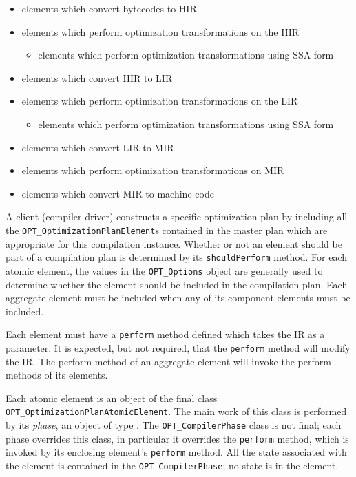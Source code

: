 \begin{itemize}
\item elements which convert bytecodes to HIR
\item elements which perform optimization transformations on the HIR
   \begin{itemize}
   \item elements which perform optimization transformations using SSA form
   \end{itemize}
\item elements which convert HIR to LIR
\item elements which perform optimization transformations on the LIR
   \begin{itemize}
   \item elements which perform optimization transformations using SSA form
   \end{itemize}
\item elements which convert LIR to MIR
\item elements which perform optimization transformations on MIR 
\item elements which convert MIR to machine code
\end{itemize}


A client (compiler driver) constructs a specific optimization plan by including all the 
{\tt OPT\_\-Op\-ti\-mi\-za\-tion\-Plan\-El\-e\-ment}s contained in the master plan which are 
appropriate for this compilation instance. 
Whether or not an element should be part of a compilation plan is determined 
by its {\tt shouldPerform} method. For each atomic element, the values in the
{\tt OPT\_Options} object are generally used to determine whether the element
should be included in the compilation plan. Each aggregate element must be 
included when any of its component elements must be included. 

Each element must have a {\tt perform} method defined which takes the IR as
a parameter. It is expected, but not required, that the {\tt perform}
method will modify the IR. 
The perform method of an aggregate element will invoke the 
perform methods of its elements.

Each atomic element is an object of the final class 
{\tt OPT\_Optimization\-Plan\-A\-to\-mic\-El\-e\-ment}. The main work of this class
is performed by its {\em phase}, an object of type 
. The
{\tt OPT\_\-Com\-pi\-ler\-Phase} class is not final; each phase overrides this class,
in particular it overrides the {\tt perform} method, which is invoked by its 
enclosing element's {\tt perform} method. All the state associated with 
the element
is contained in the {\tt OPT\_CompilerPhase}; no
state is in the element.

